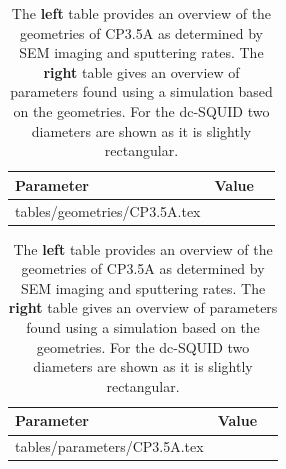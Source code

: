 \begin{table}
	\centering
	\begin{subtable}{.6\linewidth}
		\begin{tabular}[t]{@{}lrr@{}}
			\toprule
			Parameter & Value \\ \midrule
			\expandableinput tables/geometries/CP3.5A.tex
			\bottomrule
		\end{tabular}
    \end{subtable}
    \hfill
    \begin{subtable}{.3\linewidth}
    	\flushright
    	\begin{tabular}[t]{@{}lrr@{}}
    		\toprule
    		Parameter & Value \\ \midrule
    		\expandableinput tables/parameters/CP3.5A.tex
    		\bottomrule
    	\end{tabular}
    \end{subtable}
    \caption{The \textbf{left} table provides an overview of the geometries of CP3.5A as determined by SEM imaging and sputtering rates. The \textbf{right} table gives an overview of parameters found using a simulation based on the geometries. For the dc-SQUID two diameters are shown as it is slightly rectangular.}
    \label{tab:CP3.5A-geometries}
\end{table}